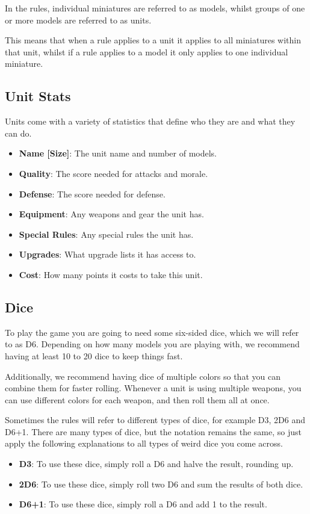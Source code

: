 \documentclass[9pt, a4paper, bookmarks=false]{extarticle}            %
\begin{document}
\begin{multicols}{2}
In the rules, individual miniatures are referred to as models, whilst groups of one or more models are referred to as units.

This means that when a rule applies to a unit it applies to all miniatures within that unit, whilst if a rule applies to a model it only applies to one individual miniature.

\subsection{Unit Stats}

Units come with a variety of statistics that define who they are and what they can do.

\begin{itemize}
  \item \textbf{Name [Size]}: The unit name and number of models.
  \item \textbf{Quality}: The score needed for attacks and morale.
  \item \textbf{Defense}: The score needed for defense.
  \item \textbf{Equipment}: Any weapons and gear the unit has.
  \item \textbf{Special Rules}: Any special rules the unit has.
  \item \textbf{Upgrades}: What upgrade lists it has access to.
  \item \textbf{Cost}: How many points it costs to take this unit.
\end{itemize}

\columnbreak

\subsection{Dice}

To play the game you are going to need some six-sided dice, which we will refer to as D6. Depending on how many models you are playing with, we recommend having at least 10 to 20 dice to keep things fast.

Additionally, we recommend having dice of multiple colors so that you can combine them for faster rolling. Whenever a unit is using multiple weapons, you can use different colors for each weapon, and then roll them all at once.

Sometimes the rules will refer to different types of dice, for example D3, 2D6 and D6+1. There are many types of dice, but the notation remains the same, so just apply the following explanations to all types of weird dice you come across.
\begin{itemize}
  \item \textbf{D3}: To use these dice, simply roll a D6 and halve the result, rounding up.
  \item \textbf{2D6}: To use these dice, simply roll two D6 and sum the results of both dice.
  \item \textbf{D6+1}: To use these dice, simply roll a D6 and add 1 to the result.
\end{itemize}


\end{multicols}
\end{document}

